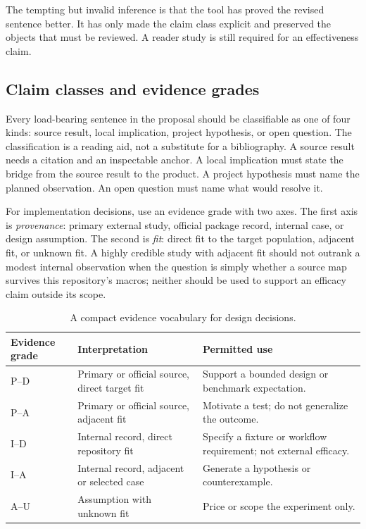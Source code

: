 The tempting but invalid inference is that the tool has proved the revised
sentence better. It has only made the claim class explicit and preserved the
objects that must be reviewed. A reader study is still required for an
effectiveness claim.

\subsection{Claim classes and evidence grades}

Every load-bearing sentence in the proposal should be classifiable as one of
four kinds: source result, local implication, project hypothesis, or open
question. The classification is a reading aid, not a substitute for a
bibliography. A source result needs a citation and an inspectable anchor. A
local implication must state the bridge from the source result to the product.
A project hypothesis must name the planned observation. An open question must
name what would resolve it.

For implementation decisions, use an evidence grade with two axes. The first
axis is \emph{provenance}: primary external study, official package record,
internal case, or design assumption. The second is \emph{fit}: direct fit to
the target population, adjacent fit, or unknown fit. A highly credible study
with adjacent fit should not outrank a modest internal observation when the
question is simply whether a source map survives this repository's macros;
neither should be used to support an efficacy claim outside its scope.

\begin{table}[H]
\centering
\small
\begin{tabularx}{\textwidth}{@{}p{}p{}L@{}}
\toprule
Evidence grade & Interpretation & Permitted use \\
\midrule
P--D & Primary or official source, direct target fit & Support a bounded
design or benchmark expectation. \\
P--A & Primary or official source, adjacent fit & Motivate a test; do not
generalize the outcome. \\
I--D & Internal record, direct repository fit & Specify a fixture or
workflow requirement; not external efficacy. \\
I--A & Internal record, adjacent or selected case & Generate a hypothesis or
counterexample. \\
A--U & Assumption with unknown fit & Price or scope the experiment only. \\
\bottomrule
\end{tabularx}
\caption{A compact evidence vocabulary for design decisions.}
\label{tab:evidence-grades}
\end{table}

